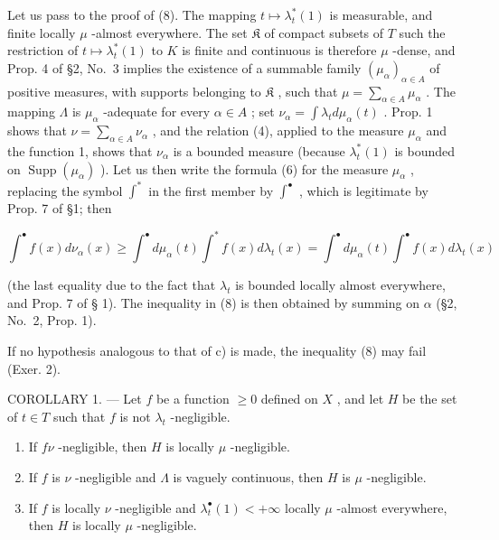 Let us pass to the proof of (8). The mapping \(t \mapsto \lambda_t^*(1)\) is measurable, and finite locally \(\mu\) -almost everywhere. The set \(\mathfrak{K}\) of compact subsets of \(T\) such the restriction of \(t \mapsto \lambda_t^*(1)\) to \(K\) is finite and continuous is therefore \(\mu\) -dense, and Prop. 4 of §2, No.~3 implies the existence of a summable family \((\mu_\alpha)_{\alpha \in A}\) of positive measures, with supports belonging to \(\mathfrak{K}\) , such that \(\mu = \sum_{\alpha \in A} \mu_\alpha\) . The mapping \(\Lambda\) is \(\mu_\alpha\) -adequate for every \(\alpha \in A\) ; set \(\nu_\alpha = \int \lambda_t d\mu_\alpha(t)\) . Prop. 1 shows that \(\nu = \sum_{\alpha \in A} \nu_\alpha\) , and the relation (4), applied to the measure \(\mu_\alpha\) and the function 1, shows that \(\nu_\alpha\) is a bounded measure (because \(\lambda_t^*(1)\) is bounded on \(\operatorname{Supp}(\mu_\alpha)\) ). Let us then write the formula (6) for the measure \(\mu_\alpha\) , replacing the symbol \(\int^*\) in the first member by \(\int^\bullet\) , which is legitimate by Prop. 7 of §1; then

\[
\int^ {\bullet} f (x) d \nu_ {\alpha} (x) \geqslant \int^ {\bullet} d \mu_ {\alpha} (t) \int^ {*} f (x) d \lambda_ {t} (x) = \int^ {\bullet} d \mu_ {\alpha} (t) \int^ {\bullet} f (x) d \lambda_ {t} (x)
\]

(the last equality due to the fact that \(\lambda_t\) is bounded locally almost everywhere, and Prop. 7 of § 1). The inequality in (8) is then obtained by summing on \(\alpha\) (§2, No.~2, Prop. 1).

If no hypothesis analogous to that of c) is made, the inequality (8) may fail (Exer. 2).

COROLLARY 1. --- Let \(f\) be a function \(\geqslant 0\) defined on \(X\) , and let \(H\) be the set of \(t \in T\) such that \(f\) is not \(\lambda_t\) -negligible.

\begin{enumerate}
\def\labelenumi{\alph{enumi})}
\item
  If \(f \nu\) -negligible, then \(H\) is locally \(\mu\) -negligible.
\item
  If \(f\) is \(\nu\) -negligible and \(\Lambda\) is vaguely continuous, then \(H\) is \(\mu\) -negligible.
\item
  If \(f\) is locally \(\nu\) -negligible and \(\lambda_t^\bullet(1) < +\infty\) locally \(\mu\) -almost everywhere, then \(H\) is locally \(\mu\) -negligible.
\end{enumerate}

